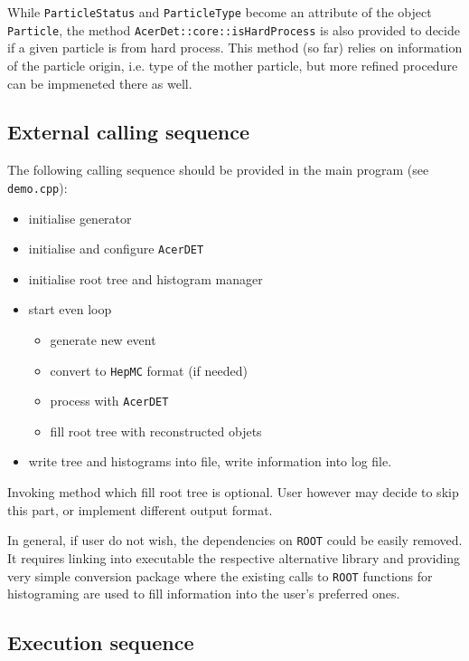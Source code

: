 While {\tt ParticleStatus} and {\tt ParticleType} become an attribute of the 
object  {\tt Particle}, the method {\tt AcerDet::core::isHardProcess} is also
provided to decide if a given particle is from hard process. This method (so far)
relies on information of the particle origin, i.e. type of the mother particle,
but more refined procedure can be impmeneted there as well. 




\subsection{External calling sequence}

The following calling sequence should be provided
in the main program (see {\tt demo.cpp}):
\begin{itemize}
\item
initialise  generator
\item
initialise and configure {\tt AcerDET}
\item
initialise root tree and histogram manager
\item
start even loop
\begin{itemize}
\item
generate new event
\item
convert to  {\tt HepMC} format (if needed)
\item
process with  {\tt AcerDET}
\item
fill root tree with reconstructed objets
\end{itemize}
\item
write tree and histograms into file, write information
into log file.
\end{itemize}

Invoking method which fill root tree is optional. 
User however may decide to skip this part, or implement
different output format.

In general, if user do not wish, the dependencies on {\tt ROOT} could be easily
removed. It requires linking into executable the respective alternative library 
and providing very simple conversion package where the existing calls to
{\tt ROOT} functions for histograming
are used  to fill information into the user's preferred ones.


\subsection{Execution sequence}

